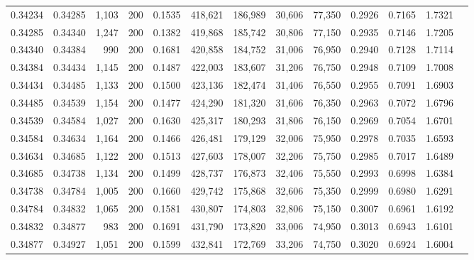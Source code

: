 \begin{tabular}{rrrrrrrrrrrrr}
0.34234 & 0.34285 &  1,103 & 200 &                                     0.1535 & 418,621 & 186,989 &  30,606 &  77,350 & 0.2926 & 0.7165 & 1.7321 \\
0.34285 & 0.34340 &  1,247 & 200 &                                     0.1382 & 419,868 & 185,742 &  30,806 &  77,150 & 0.2935 & 0.7146 & 1.7205 \\
0.34340 & 0.34384 &    990 & 200 &                                     0.1681 & 420,858 & 184,752 &  31,006 &  76,950 & 0.2940 & 0.7128 & 1.7114 \\
0.34384 & 0.34434 &  1,145 & 200 &                                     0.1487 & 422,003 & 183,607 &  31,206 &  76,750 & 0.2948 & 0.7109 & 1.7008 \\
0.34434 & 0.34485 &  1,133 & 200 &                                     0.1500 & 423,136 & 182,474 &  31,406 &  76,550 & 0.2955 & 0.7091 & 1.6903 \\
0.34485 & 0.34539 &  1,154 & 200 &                                     0.1477 & 424,290 & 181,320 &  31,606 &  76,350 & 0.2963 & 0.7072 & 1.6796 \\
0.34539 & 0.34584 &  1,027 & 200 &                                     0.1630 & 425,317 & 180,293 &  31,806 &  76,150 & 0.2969 & 0.7054 & 1.6701 \\
0.34584 & 0.34634 &  1,164 & 200 &                                     0.1466 & 426,481 & 179,129 &  32,006 &  75,950 & 0.2978 & 0.7035 & 1.6593 \\
0.34634 & 0.34685 &  1,122 & 200 &                                     0.1513 & 427,603 & 178,007 &  32,206 &  75,750 & 0.2985 & 0.7017 & 1.6489 \\
0.34685 & 0.34738 &  1,134 & 200 &                                     0.1499 & 428,737 & 176,873 &  32,406 &  75,550 & 0.2993 & 0.6998 & 1.6384 \\
0.34738 & 0.34784 &  1,005 & 200 &                                     0.1660 & 429,742 & 175,868 &  32,606 &  75,350 & 0.2999 & 0.6980 & 1.6291 \\
0.34784 & 0.34832 &  1,065 & 200 &                                     0.1581 & 430,807 & 174,803 &  32,806 &  75,150 & 0.3007 & 0.6961 & 1.6192 \\
0.34832 & 0.34877 &    983 & 200 &                                     0.1691 & 431,790 & 173,820 &  33,006 &  74,950 & 0.3013 & 0.6943 & 1.6101 \\
0.34877 & 0.34927 &  1,051 & 200 &                                     0.1599 & 432,841 & 172,769 &  33,206 &  74,750 & 0.3020 & 0.6924 & 1.6004 \\

\end{tabular}
